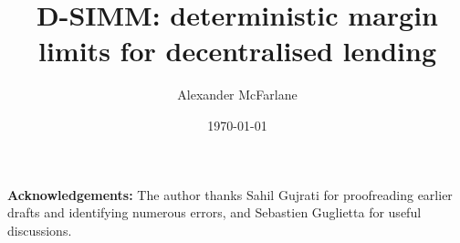 \documentclass[11pt]{article}
\title{D-SIMM: deterministic margin limits for decentralised lending}
\author{Alexander McFarlane}
\date{\today}
\begin{document}
\maketitle


\noindent\textbf{Acknowledgements:}
The author thanks Sahil Gujrati for proofreading earlier drafts and identifying numerous errors, and Sebastien Guglietta for useful discussions.









\appendix
{}
\clearpage
\clearpage

\newpage


\end{document}
